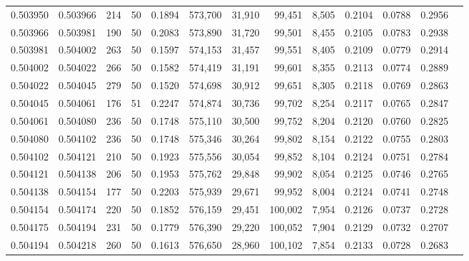\begin{tabular}{rrrrrrrrrrrrr}
0.503950 & 0.503966 & 214 &  50 &                                     0.1894 & 573,700 &  31,910 &  99,451 &   8,505 & 0.2104 & 0.0788 & 0.2956 \\
0.503966 & 0.503981 & 190 &  50 &                                     0.2083 & 573,890 &  31,720 &  99,501 &   8,455 & 0.2105 & 0.0783 & 0.2938 \\
0.503981 & 0.504002 & 263 &  50 &                                     0.1597 & 574,153 &  31,457 &  99,551 &   8,405 & 0.2109 & 0.0779 & 0.2914 \\
0.504002 & 0.504022 & 266 &  50 &                                     0.1582 & 574,419 &  31,191 &  99,601 &   8,355 & 0.2113 & 0.0774 & 0.2889 \\
0.504022 & 0.504045 & 279 &  50 &                                     0.1520 & 574,698 &  30,912 &  99,651 &   8,305 & 0.2118 & 0.0769 & 0.2863 \\
0.504045 & 0.504061 & 176 &  51 &                                     0.2247 & 574,874 &  30,736 &  99,702 &   8,254 & 0.2117 & 0.0765 & 0.2847 \\
0.504061 & 0.504080 & 236 &  50 &                                     0.1748 & 575,110 &  30,500 &  99,752 &   8,204 & 0.2120 & 0.0760 & 0.2825 \\
0.504080 & 0.504102 & 236 &  50 &                                     0.1748 & 575,346 &  30,264 &  99,802 &   8,154 & 0.2122 & 0.0755 & 0.2803 \\
0.504102 & 0.504121 & 210 &  50 &                                     0.1923 & 575,556 &  30,054 &  99,852 &   8,104 & 0.2124 & 0.0751 & 0.2784 \\
0.504121 & 0.504138 & 206 &  50 &                                     0.1953 & 575,762 &  29,848 &  99,902 &   8,054 & 0.2125 & 0.0746 & 0.2765 \\
0.504138 & 0.504154 & 177 &  50 &                                     0.2203 & 575,939 &  29,671 &  99,952 &   8,004 & 0.2124 & 0.0741 & 0.2748 \\
0.504154 & 0.504174 & 220 &  50 &                                     0.1852 & 576,159 &  29,451 & 100,002 &   7,954 & 0.2126 & 0.0737 & 0.2728 \\
0.504175 & 0.504194 & 231 &  50 &                                     0.1779 & 576,390 &  29,220 & 100,052 &   7,904 & 0.2129 & 0.0732 & 0.2707 \\
0.504194 & 0.504218 & 260 &  50 &                                     0.1613 & 576,650 &  28,960 & 100,102 &   7,854 & 0.2133 & 0.0728 & 0.2683 \\

\end{tabular}
